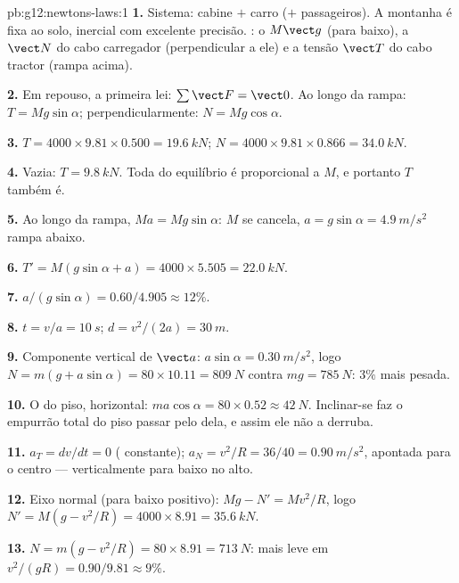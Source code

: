 \begin{solution}{pb:g12:newtons-laws:1}
\textbf{1.} Sistema: cabine $+$ carro ($+$ passageiros). A montanha é
fixa ao solo, inercial com excelente precisão. : o 
$M\vect g$ (para baixo), a  $\vect N$ do cabo carregador
(perpendicular a ele) e a tensão $\vect T$ do cabo tractor (rampa
acima).

\textbf{2.} Em repouso, a primeira lei: $\sum \vect F = \vect 0$. Ao
longo da rampa: $T = Mg\sin\alpha$; perpendicularmente:
$N = Mg\cos\alpha$.

\textbf{3.} $T = 4000 \times 9.81 \times 0.500 = \qty{19.6}{kN}$;
$N = 4000 \times 9.81 \times 0.866 = \qty{34.0}{kN}$.

\textbf{4.} Vazia: $T = \qty{9.8}{kN}$. Toda  do equilíbrio é
proporcional a $M$, e portanto $T$ também é.

\textbf{5.} Ao longo da rampa, $Ma = Mg\sin\alpha$: $M$ se cancela,
$a = g\sin\alpha = \qty{4.9}{m/s^2}$ rampa abaixo.

\textbf{6.} $T' = M(g\sin\alpha + a) = 4000 \times 5.505 =
\qty{22.0}{kN}$.

\textbf{7.} $a/(g\sin\alpha) = 0.60/4.905 \approx 12\%$.

\textbf{8.} $t = v/a = \qty{10}{s}$; $d = v^2/(2a) = \qty{30}{m}$.

\textbf{9.} Componente vertical de $\vect a$: $a\sin\alpha =
\qty{0.30}{m/s^2}$, logo $N = m(g + a\sin\alpha) = 80 \times 10.11 =
\qty{809}{N}$ contra $mg = \qty{785}{N}$: $3\%$ mais pesada.

\textbf{10.} O  do piso, horizontal:
$ma\cos\alpha = 80 \times 0.52 \approx \qty{42}{N}$. Inclinar-se faz o
empurrão total do piso passar pelo  dela, e assim ele não
a derruba.

\textbf{11.} $a_T = dv/dt = 0$ ( constante);
$a_N = v^2/R = 36/40 = \qty{0.90}{m/s^2}$, apontada para o centro ---
verticalmente para baixo no alto.

\textbf{12.} Eixo normal (para baixo positivo): $Mg - N' = Mv^2/R$,
logo $N' = M(g - v^2/R) = 4000 \times 8.91 = \qty{35.6}{kN}$.

\textbf{13.} $N = m(g - v^2/R) = 80 \times 8.91 = \qty{713}{N}$: mais
leve em $v^2/(gR) = 0.90/9.81 \approx 9\%$.


\end{solution}
